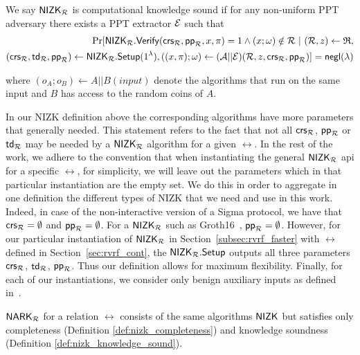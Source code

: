 \begin{definition}\label{def:nizk_knowledge_sound}
	We say ${\mathsf{NIZK}}_\mathcal{R}$ is {computational knowledge sound}  if %
	for any non-uniform PPT adversary \adv there exists a PPT extractor $ \mathcal{E} $
	such that
	\begin{align}
		\Pr[{\mathsf{NIZK}}_\mathcal{R}.{\mathsf{Verify}}(\mathsf{crs}_\mathcal{R}, \mathsf{pp}_\mathcal{R}, x,\pi) = 1 \wedge  (x;\omega) \notin \mathcal{R} \ | \ (\mathcal{R},z) \leftarrow \mathfrak{R}, \\  
		(\mathsf{crs}_\mathcal{R},\mathsf{td}_\mathcal{R},  \mathsf{pp}_\mathcal{R}) \leftarrow {\ensuremath{\mathsf{NIZK}}}_\mathcal{R}.{\mathsf{Setup}}(1^{\lambda}),\nonumber ((x,\pi);\omega)\leftarrow (\mathcal{A}||\mathcal{E})(\mathcal{R}, z, \mathsf{crs}_\mathcal{R},  \mathsf{pp}_\mathcal{R})] =  \mathsf{negl}(\lambda) \nonumber
	\end{align}
	
	\noindent where $ (o_A;o_B)\leftarrow A||B(input) $ denote the algorithms that run on the same input and $ B $ has access to the random coins of $ A $.
\end{definition}

\noindent In our NIZK definition above the corresponding algorithms have more parameters that generally needed. 
This statement refers to the fact that not all $\mathsf{crs}_\mathcal{R}$, $\mathsf{pp}_\mathcal{R}$ or $\mathsf{td}_\mathcal{R}$ may be needed by a ${\mathsf{NIZK}}_\mathcal{R}$ algorithm for a given $\rel$. 
In the rest of the work, we adhere to the convention that when instantiating the general ${\mathsf{NIZK}}_\mathcal{R}$ api for a specific $\rel$, for simplicity, 
we will leave out the parameters which in that particular instantiation are the empty set. We do this in order to aggregate in one definition 
the different types of NIZK that we need and use in this work. Indeed, in case of the non-interactive version of a Sigma protocol, we have 
that $\mathsf{crs}_\mathcal{R} = \emptyset$ and $\mathsf{pp}_\mathcal{R} = \emptyset$. For a ${\mathsf{NIZK}}_\mathcal{R}$ such as Groth16~\cite{Groth16}, $\mathsf{pp}_\mathcal{R}  = \emptyset$. 
However, for our particular instantiation of ${\mathsf{NIZK}}_\mathcal{R}$ in Section~\ref{subsec:rvrf_faster} with $\rel$ defined in Section~\ref{sec:rvrf_cont}, the ${\mathsf{NIZK}}_\mathcal{R}.{\mathsf{Setup}}$ outputs 
all three parameters $\mathsf{crs}_\mathcal{R}$, $\mathsf{td}_\mathcal{R}$, $\mathsf{pp}_\mathcal{R}$. Thus our definition allows for maximum flexibility. Finally, for each of our instantiations, we consider only benign 
auxiliary inputs as defined in~\cite{bening_auxiliary}. 

\begin{definition} $ \mathsf{NARK}_\mathcal{R} $ for a relation $ \rel $ consists of the same algorithms $ {\mathsf{NIZK}} $ but satisfies only completeness (Definition \ref{def:nizk_completeness}) and knowledge soundness (Definition \ref{def:nizk_knowledge_sound}).
\end{definition}

